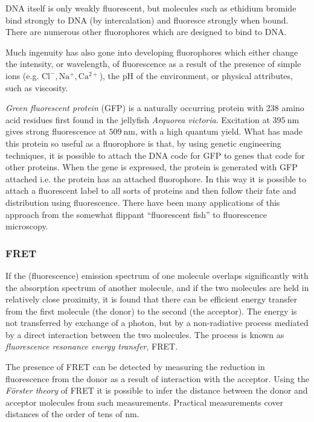\documentclass{article}
\theoremstyle{plain}\theoremheaderfont{\normalfont\itshape}\theorembodyfont{\rmfamily}\theoremseparator{.}\newtheorem*{rem}{Remark}\newtheorem*{ex}{Example}\newtheorem*{proof}{Proof}\newtheorem*{altp}{Alternative proof}
\theoremstyle{plain}\theoremheaderfont{\normalfont\bfseries}\theorembodyfont{\rmfamily}\theoremseparator{.}\newtheorem{thm}{Theorem}[section]\newtheorem{lem}[thm]{Lemma}\newtheorem{prop}[thm]{Proposition}\newtheorem*{cor}{Corollary}\newtheorem{defn}[thm]{Definition}\newtheorem{clm}[thm]{Claim}\newtheorem{clminproof}{Claim}\newtheorem{pos}{Postulate}[section]
\theoremstyle{break}\theoremheaderfont{\normalfont\itshape}\theorembodyfont{\rmfamily}\theoremseparator{.\medskip}\newtheorem*{proofskip}{Proof}\newtheorem*{exs}{Examples}\newtheorem*{rems}{Remarks}
\theoremstyle{break}\theoremheaderfont{\normalfont\bfseries}\theorembodyfont{\rmfamily}\theoremseparator{.\medskip}\newtheorem{lemskip}[thm]{Lemma}\newtheorem{defnskip}[thm]{Definition}\newtheorem{propskip}[thm]{Proposition}\newtheorem{thmskip}[thm]{Theorem}
\numberwithin{equation}{section}
\newcommand{\unit}[1]{\ \mathrm{#1}}
\begin{document}
    DNA itself is only weakly fluorescent, but molecules such as ethidium bromide bind strongly to DNA (by intercalation) and fluoresce strongly when bound. There are numerous other fluorophores which are designed to bind to DNA.

    Much ingenuity has also gone into developing fluorophores which either change the intensity, or wavelength, of fluorescence as a result of the presence of simple ions (e.g. \(\mathrm{Cl^-, Na^+, Ca^{2+}}\)), the \(\mathrm{pH}\) of the environment, or physical attributes, such as viscosity.

    \textit{Green fluorescent protein} (GFP) is a naturally occurring protein with 238 amino acid residues first found in the jellyfish \textit{Aequorea victoria}. Excitation at \(395\unit{nm}\) gives strong fluorescence at \(509\unit{nm}\), with a high quantum yield. What has made this protein so useful as a fluorophore is that, by using genetic engineering techniques, it is possible to attach the DNA code for GFP to genes that code for other proteins. When the gene is expressed, the protein is generated with GFP attached i.e. the protein has an attached fluorophore. In this way it is possible to attach a fluorescent label to all sorts of proteins and then follow their fate and distribution using fluorescence. There have been many applications of this approach from the somewhat flippant ``fluorescent fish'' to fluorescence microscopy.

    \subsubsection{FRET}
    If the (fluorescence) emission spectrum of one molecule overlaps significantly with the absorption spectrum of another molecule, and if the two molecules are held in relatively close proximity, it is found that there can be efficient energy transfer from the first molecule (the donor) to the second (the acceptor). The energy is not transferred by exchange of a photon, but by a non-radiative process mediated by a direct interaction between the two molecules. The process is known as \textit{fluorescence resonance energy transfer}, FRET.

    The presence of FRET can be detected by measuring the reduction in fluorescence from the donor as a result of interaction with the acceptor. Using the \textit{F\"{o}rster theory} of FRET it is possible to infer the distance between the donor and acceptor molecules from such measurements. Practical measurements cover distances of the order of tens of nm.
\end{document}

